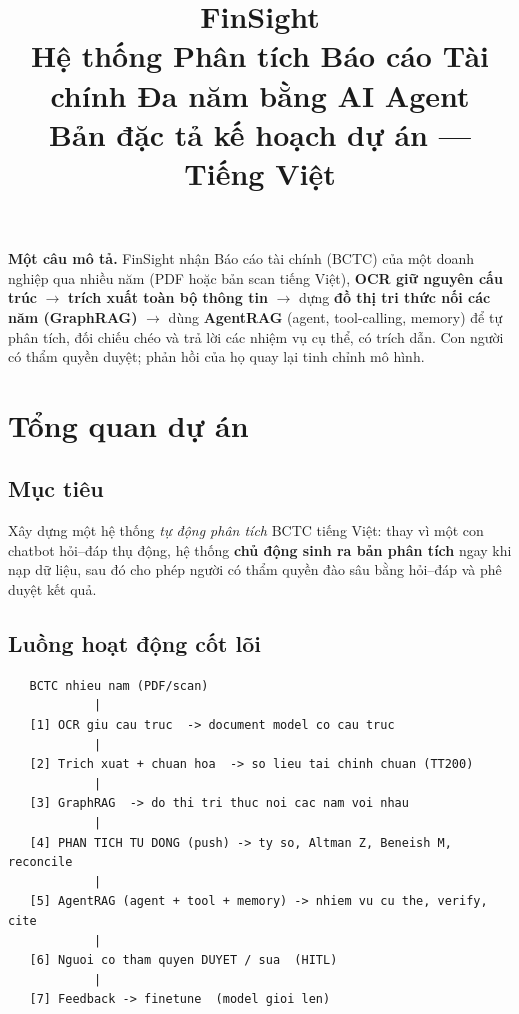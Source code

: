 \documentclass[11pt,a4paper]{article}
\title{\vspace{-1.2cm}\textbf{\color{fsblue}FinSight}\\[4pt]
\large Hệ thống Phân tích Báo cáo Tài chính Đa năm bằng AI Agent\\[6pt]
\normalsize\color{fsgray} Bản đặc tả kế hoạch dự án --- Tiếng Việt}
\author{}
\date{}
\begin{document}
\maketitle
\thispagestyle{fancy}
\vspace{-1.0cm}

\begin{ghichu}
\textbf{Một câu mô tả.} FinSight nhận Báo cáo tài chính (BCTC) của một doanh nghiệp qua nhiều năm (PDF hoặc bản scan tiếng Việt), \textbf{OCR giữ nguyên cấu trúc} $\rightarrow$ \textbf{trích xuất toàn bộ thông tin} $\rightarrow$ dựng \textbf{đồ thị tri thức nối các năm (GraphRAG)} $\rightarrow$ dùng \textbf{AgentRAG} (agent, tool-calling, memory) để tự phân tích, đối chiếu chéo và trả lời các nhiệm vụ cụ thể, có trích dẫn. Con người có thẩm quyền duyệt; phản hồi của họ quay lại tinh chỉnh mô hình.
\end{ghichu}

\tableofcontents
\vspace{0.4cm}

\section{Tổng quan dự án}

\subsection{Mục tiêu}
Xây dựng một hệ thống \emph{tự động phân tích} BCTC tiếng Việt: thay vì một con chatbot hỏi--đáp thụ động, hệ thống \textbf{chủ động sinh ra bản phân tích} ngay khi nạp dữ liệu, sau đó cho phép người có thẩm quyền đào sâu bằng hỏi--đáp và phê duyệt kết quả.

\subsection{Luồng hoạt động cốt lõi}
\begin{verbatim}
   BCTC nhieu nam (PDF/scan)
            |
   [1] OCR giu cau truc  -> document model co cau truc
            |
   [2] Trich xuat + chuan hoa  -> so lieu tai chinh chuan (TT200)
            |
   [3] GraphRAG  -> do thi tri thuc noi cac nam voi nhau
            |
   [4] PHAN TICH TU DONG (push) -> ty so, Altman Z, Beneish M, reconcile
            |
   [5] AgentRAG (agent + tool + memory) -> nhiem vu cu the, verify, cite
            |
   [6] Nguoi co tham quyen DUYET / sua  (HITL)
            |
   [7] Feedback -> finetune  (model gioi len)
\end{verbatim}
\end{document}
